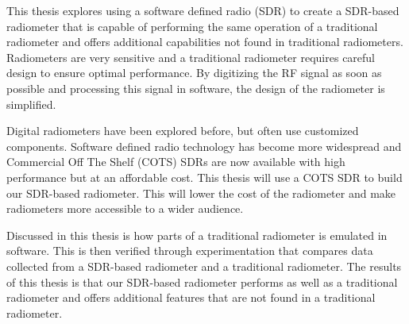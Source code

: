 
This thesis explores using a software defined radio (SDR) to create a SDR-based radiometer that is capable of performing the same operation of a traditional radiometer and offers additional capabilities not found in traditional radiometers.  Radiometers are very sensitive and a traditional radiometer requires careful design to ensure optimal performance.  By digitizing the RF signal as soon as possible and processing this signal in software, the design of the radiometer is simplified.

Digital radiometers have been explored before, but often use customized components.  Software defined radio technology has become more widespread and Commercial Off The Shelf (COTS) SDRs are now available with high performance but at an affordable cost.  This thesis will use a COTS SDR to build our SDR-based radiometer.  This will lower the cost of the radiometer and make radiometers more accessible to a wider audience.  

Discussed in this thesis is how parts of a traditional radiometer is emulated in software.  This is then verified through experimentation that compares data collected from a SDR-based radiometer and a traditional radiometer.  The results of this thesis is that our SDR-based radiometer performs as well as a traditional radiometer and offers additional features that are not found in a traditional radiometer.
